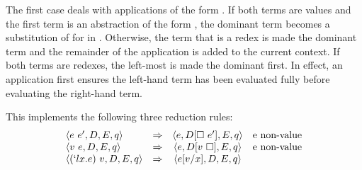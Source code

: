 The first case deals with applications of the form . If both terms are values and the first term is an abstraction of the form , the dominant term becomes a substitution of  for  in . Otherwise, the term that is a redex is made the dominant term and the remainder of the application is added to the current context. If both terms are redexes, the left-most is made the dominant first. In effect, an application first ensures the left-hand term has been evaluated fully before evaluating the right-hand term.  
\begin{comment}
eval (State (App e e') d es q) = case e of
  Val v -> case e' of 
    Val _ -> case v of (Abs x m) -> State (Sub m e' x) d es q
    otherwise -> State e' (ret d (App e Hole)) es q
  otherwise -> State e (ret d (App Hole e')) es q
\end{comment}
\begin{Shaded}
\begin{Highlighting}[]
 \NormalTok{(} \FunctionTok{=}  
   \OtherTok{->}   
     \NormalTok{_ }\OtherTok{->}   \NormalTok{(} \OtherTok{->}  \NormalTok{(} 
    \OtherTok{->}   
  \OtherTok{->}    
\end{Highlighting}
\end{Shaded}
This implements the following three reduction rules:
\[
\begin{array}{lrcl}
  \langle e\ e^\prime, D, E, q \rangle &\Rightarrow &\langle e, D[\square\ e^\prime], E, q \rangle &\text{e non-value} \\
  \langle v\ e, D, E, q \rangle &\Rightarrow &\langle e, D[v\ \square], E, q \rangle &\text{e non-value} \\
  \langle (`lx.e)\ v, D, E, q \rangle &\Rightarrow &\langle e[v/x], D, E, q \rangle
\end{array}
\]

